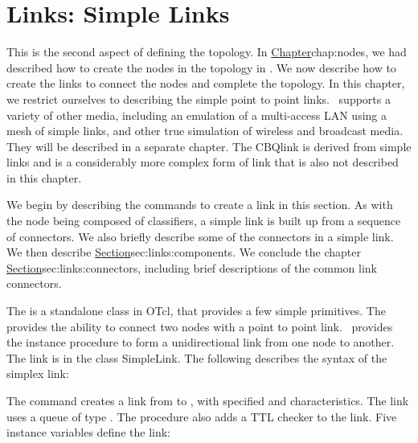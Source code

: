\chapter{Links: Simple Links}
\label{chap:links}

This is the second aspect of defining the topology.
In \href{the previous chapter}{Chapter}{chap:nodes},
we had described how to create the nodes in the topology in \ns.
We now describe how to create the links to connect the nodes and complete
the topology.
In this chapter, we restrict ourselves to describing the simple
point to point links.
\ns\ supports a variety of other media, including
an emulation of a multi-access LAN using a mesh of simple links,
and other true simulation of wireless and broadcast media.
They will be described in a separate chapter.
The CBQlink is derived from simple links and is a considerably more
complex form of link that is also not described in this chapter.

We begin by describing the commands to create a link in this section.
As with the node being composed of classifiers, 
a simple link is built up from a sequence of connectors.
We also briefly describe some of the connectors in a simple link.
We then describe
\href{the instance procedures that operate on the various components of
defined by some of these connectors}{Section}{sec:links:components}.
We conclude the chapter
\href{with a description the connector object}{Section}{sec:links:connectors},
including brief
descriptions of the common link connectors.

The 
is a standalone class in OTcl,
that provides a few simple primitives.
The 
provides the ability to connect two nodes with a point to point link.
\ns\ provides the instance procedure
to form a unidirectional link from one node to another.
The link is in the class SimpleLink.
The following describes the syntax of the simplex link:
The command creates a link from  to ,
with specified  and  characteristics.
The link uses a queue of type .
The procedure also adds a TTL checker to the link.
Five instance variables define the link:

